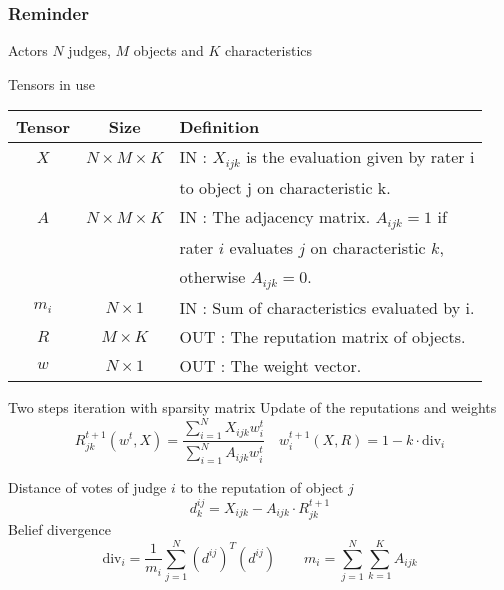 \begin{frame}[allowframebreaks]
\frametitle{Reminder}
\begin{block}{Actors}
$N$ judges, $M$ objects and $K$ characteristics
\end{block}
\begin{block}{Tensors in use}
\centering
\begin{tabular}{@{}ccl@{}}
\hline
Tensor & Size                  & Definition                                                                                                     \\ \hline
$X$    & $N \times M \times K$ & IN : $X_{ijk}$ is the evaluation given by rater i\\
          &                                     &  to object j on characteristic k. \\
$A$    & $N \times M \times K$ & IN : The adjacency matrix. $A_{ijk} = 1$ if \\
          &                                & rater $i$ evaluates $j$ on characteristic $k$, \\
          &                                & otherwise $A_{ijk} = 0$. \\
$m_i$ & $N \times 1$          & IN : Sum of characteristics evaluated by i. \\                                                        
$R$    & $M \times K$          & OUT : The reputation matrix of objects. \\
$w$    & $N \times 1$          & OUT : The weight vector.     \\
\end{tabular}
\end{block}

\framebreak

    \begin{block}{Two steps iteration with sparsity matrix}
    Update of the reputations and weights
        \[
            R_{jk}^{t+1}(w^t,X) = \frac{\sum_{i=1}^N X_{ijk}w^t_{i}}{\sum_{i=1}^{N} A_{ijk} w^t_{i}} \quad 
        	w_i^{t+1}(X,R) = 1 -k \cdot \mathrm{div}_i \]

    \end{block}
    
    
    \begin{block}{}
    Distance of votes of judge $i$ to the reputation of object $j$
    \[d^{ij}_k= X_{ijk}-A_{ijk}\cdot R^{t+1}_{jk} \]
    Belief divergence
    \[ \mathrm{div}_i =  \frac{1}{m_i}\sum_{j=1}^N (d^{ij})^T (d^{ij}) \qquad m_i = \sum_{j=1}^{N} \sum_{k=1}^{K} A_{ijk} \]
    \end{block}
\end{frame}

